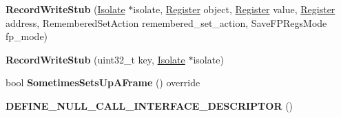 \begin{DoxyCompactItemize}
\item 
{\bfseries Record\+Write\+Stub} (\hyperlink{classv8_1_1internal_1_1_isolate}{Isolate} $\ast$isolate, \hyperlink{structv8_1_1internal_1_1_register}{Register} object, \hyperlink{structv8_1_1internal_1_1_register}{Register} value, \hyperlink{structv8_1_1internal_1_1_register}{Register} address, Remembered\+Set\+Action remembered\+\_\+set\+\_\+action, Save\+F\+P\+Regs\+Mode fp\+\_\+mode)\hypertarget{classv8_1_1internal_1_1_record_write_stub_a6f773cf58e28bfb7b2c5da464fd3f145}{}\label{classv8_1_1internal_1_1_record_write_stub_a6f773cf58e28bfb7b2c5da464fd3f145}

\item 
{\bfseries Record\+Write\+Stub} (uint32\+\_\+t key, \hyperlink{classv8_1_1internal_1_1_isolate}{Isolate} $\ast$isolate)\hypertarget{classv8_1_1internal_1_1_record_write_stub_a9442f95c68a538cf8d22e7f5a7a247b5}{}\label{classv8_1_1internal_1_1_record_write_stub_a9442f95c68a538cf8d22e7f5a7a247b5}

\item 
bool {\bfseries Sometimes\+Sets\+Up\+A\+Frame} () override\hypertarget{classv8_1_1internal_1_1_record_write_stub_a636954d69a10f35b09d319f92e167699}{}\label{classv8_1_1internal_1_1_record_write_stub_a636954d69a10f35b09d319f92e167699}

\item 
{\bfseries D\+E\+F\+I\+N\+E\+\_\+\+N\+U\+L\+L\+\_\+\+C\+A\+L\+L\+\_\+\+I\+N\+T\+E\+R\+F\+A\+C\+E\+\_\+\+D\+E\+S\+C\+R\+I\+P\+T\+OR} ()\hypertarget{classv8_1_1internal_1_1_record_write_stub_a886f020173ce417f40c5704f6a582d6f}{}\label{classv8_1_1internal_1_1_record_write_stub_a886f020173ce417f40c5704f6a582d6f}

\end{DoxyCompactItemize}
